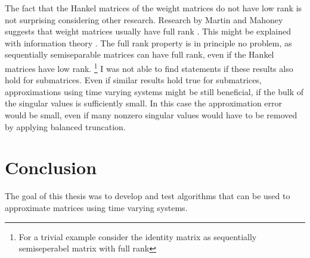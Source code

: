 \documentclass[doctype=mastersthesis,BCOR=15mm,biblatex]{ldvbook}%
\begin{document}
The fact that the Hankel matrices of the weight matrices do not have low rank is not surprising considering other research.
Research by Martin and Mahoney suggests that weight matrices usually have full rank \cite{martin_implicit_2021}.
This might be explained with information theory \cite{papyan_traces_2020}.
The full rank property is in principle no problem, as sequentially semiseparable matrices can have full rank, even if the Hankel matrices have low rank. 
\footnote{For a trivial example consider the identity matrix as sequentially semiseperabel matrix with full rank}
I was not able to find statements if these results also hold for submatrices.
Even if similar results hold true for submatrices, approximations using time varying systems might be still beneficial, if the bulk of the singular values is sufficiently small.
In this case the approximation error would be small, even if many nonzero singular values would have to be removed by applying balanced truncation.




\chapter{Conclusion}\label{chap:conclusion}
The goal of this thesis was to develop and test algorithms that can be used to approximate matrices using time varying systems.
\end{document}
